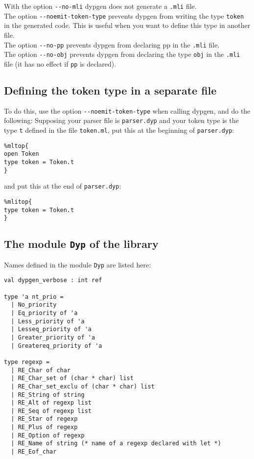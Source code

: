 \documentclass[12pt]{article}
\begin{document}
{With the option \verb|--no-mli| dypgen does not generate a \verb|.mli| file.\\

The option \verb|--noemit-token-type| prevents dypgen from writing the type \verb|token| in the generated code. This is useful when you want to define this type in another file.\\

The option \verb|--no-pp| prevents dypgen from declaring pp in the \verb|.mli| file.\\

The option \verb|--no-obj| prevents dypgen from declaring the type \verb|obj| in the \verb|.mli| file (it has no effect if \verb|pp| is declared).

\subsection{Defining the token type in a separate file}

To do this, use the option \verb|--noemit-token-type| when calling dypgen, and do the following:
Supposing your parser file is \verb|parser.dyp| and your token type is the type \verb|t| defined in the file \verb|token.ml|, put this at the beginning of \verb|parser.dyp|:
\begin{verbatim}
%mltop{
open Token
type token = Token.t
}
\end{verbatim}
 
and put this at the end of \verb|parser.dyp|:

\begin{verbatim}
%mlitop{
type token = Token.t
}
\end{verbatim}

\subsection{The module \texttt{Dyp} of the library}
Names defined in the module \verb|Dyp| are listed here:
\begin{verbatim}
val dypgen_verbose : int ref

type 'a nt_prio =
  | No_priority
  | Eq_priority of 'a
  | Less_priority of 'a
  | Lesseq_priority of 'a
  | Greater_priority of 'a
  | Greatereq_priority of 'a

type regexp =
  | RE_Char of char
  | RE_Char_set of (char * char) list
  | RE_Char_set_exclu of (char * char) list
  | RE_String of string
  | RE_Alt of regexp list
  | RE_Seq of regexp list
  | RE_Star of regexp
  | RE_Plus of regexp
  | RE_Option of regexp
  | RE_Name of string (* name of a regexp declared with let *)
  | RE_Eof_char


\end{verbatim}}
\end{document}
